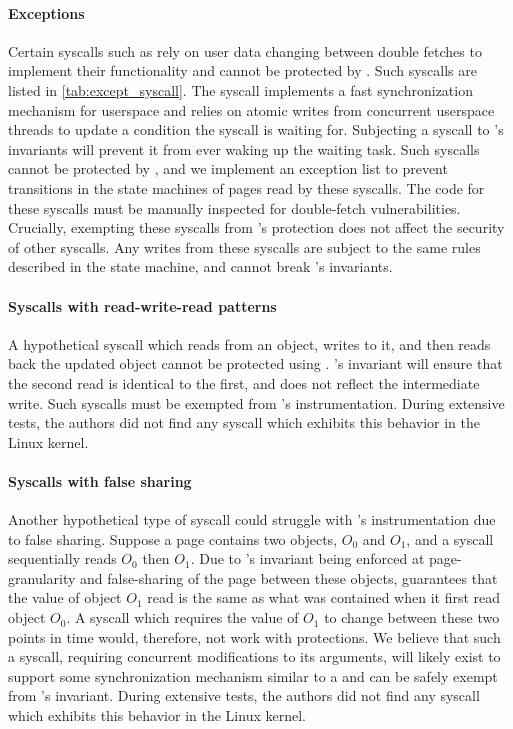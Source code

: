 \documentclass[letterpaper,twocolumn,10pt, anonymous]{article}
\begin{document}
\paragraph{Exceptions}
Certain syscalls such as  rely on user data changing between 
double fetches to implement their functionality and cannot be protected by
\tiktok.
Such syscalls are listed in \autoref{tab:except_syscall}.
The  syscall implements a fast synchronization mechanism
for userspace and relies on atomic writes from concurrent userspace
threads to update a condition the syscall is waiting for. 
Subjecting a  syscall to \tiktok's invariants will prevent
it from ever waking up the waiting task.
Such syscalls cannot be protected by \tiktok, and we implement an 
exception list to prevent transitions in the state machines of pages read 
by these syscalls.
The code for these syscalls must be manually inspected for double-fetch 
vulnerabilities.
Crucially, exempting these syscalls from \tiktok's protection does not 
affect the security of other syscalls. 
Any writes from these syscalls are subject to the same rules described
in the state machine, and cannot break \tiktok's invariants.


\paragraph{Syscalls with read-write-read patterns}
A hypothetical syscall which reads from an object, writes to it, and
then reads back the updated object cannot be protected using \tiktok.
\tiktok's invariant will ensure that the second read is identical to the first,
and does not reflect the intermediate write.
Such syscalls must be exempted from \tiktok's instrumentation.
During extensive tests, the authors did not find any syscall which exhibits this behavior in the Linux
kernel. 

\paragraph{Syscalls with false sharing}
Another hypothetical type of syscall could struggle with \tiktok's 
instrumentation due to false sharing.
Suppose a page contains two objects, $O_0$ and $O_1$, and a syscall  
sequentially reads $O_0$ then $O_1$.
Due to \tiktok's invariant being enforced at page-granularity and 
false-sharing of the page between these objects, \tiktok guarantees that
the value of object $O_1$ read is the same as what was contained when it 
first read object $O_0$. 
A syscall which requires the value of $O_1$ to change between these two 
points in time would, therefore, not work with \tiktok protections. 
We believe that such a syscall, requiring concurrent modifications to its 
arguments, will likely exist to support some synchronization mechanism 
similar to a  and can be safely exempt from \tiktok's invariant.
%
During extensive tests, the authors did not find any syscall which exhibits this behavior in the 
Linux kernel. 
\end{document}

